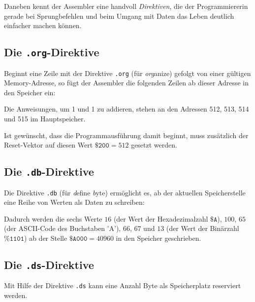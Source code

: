 \documentclass[11pt]{scrartcl}
\newcommand{\hex}[1]{\texttt{\$#1}}
\newcommand{\bin}[1]{\texttt{\%#1}}
\begin{document}
Daneben kennt der Assembler eine handvoll \emph{Direktiven}, die der
Programmiererin gerade bei Sprungbefehlen und beim Umgang mit Daten
das Leben deutlich einfacher machen können.

\subsection{Die \texttt{.org}-Direktive}
\label{sec:org_directive}

Beginnt eine Zeile mit der Direktive \lstinline!.org! (für
\emph{org}anize) gefolgt von einer gültigen Memory-Adresse, so fügt
der Assembler die folgenden Zeilen ab dieser Adresse in den Speicher
ein:

\begin{center}
  
\end{center}

Die Anweisungen, um 1 und 1 zu addieren, stehen an den Adressen 512,
513, 514 und 515 im Hauptspeicher.

Ist gewünscht, dass die Programmausführung damit beginnt, muss
zusätzlich der Reset-Vektor auf diesen Wert $\hex{200}=512$ gesetzt
werden.

\subsection{Die \lstinline!.db!-Direktive}
\label{sec:db-directive}

Die Direktive \lstinline!.db! (für \emph{d}efine \emph{b}yte)
ermöglicht es, ab der aktuellen Speicherstelle eine Reihe von Werten
als Daten zu schreiben:

\begin{center}
  
\end{center}

Dadurch werden die sechs Werte $16$ (der Wert der Hexadezimalzahl
$\hex{A}$), $100$, $65$ (der ASCII-Code des Buchstaben 'A'), $66$,
$67$ und $13$ (der Wert der Binärzahl $\bin{1101}$) ab der Stelle
$\hex{A000}=40960$ in den Speicher geschrieben.

\subsection{Die \lstinline!.ds!-Direktive}
\label{sec:ds_directive}

Mit Hilfe der Direktive \lstinline!.ds! kann eine Anzahl Byte als
Speicherplatz reserviert werden.
\end{document}
